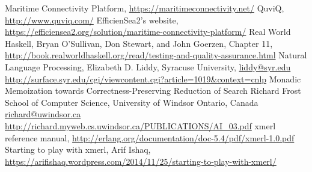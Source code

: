\begin{thebibliography}{9}
		Maritime Connectivity Platform,
		\url{https://maritimeconnectivity.net/}
		QuviQ,
		\url{http://www.quviq.com/}
		EfficienSea2's website,
		\url{https://efficiensea2.org/solution/maritime-connectivity-platform/}
		Real World Haskell,
		Bryan O'Sullivan, Don Stewart, and John Goerzen,
		Chapter 11,
		\url{http://book.realworldhaskell.org/read/testing-and-quality-assurance.html}
		Natural Language Processing,
		Elizabeth D. Liddy,
		Syracuse University,
		\url{liddy@syr.edu}
		\url{http://surface.syr.edu/cgi/viewcontent.cgi?article=1019&context=cnlp}
		Monadic Memoization towards Correctness-Preserving Reduction of Search
		Richard Frost
		School of Computer Science, University of Windsor
		Ontario, Canada
		\url{richard@uwindsor.ca}
		\url{http://richard.myweb.cs.uwindsor.ca/PUBLICATIONS/AI_03.pdf}
		xmerl reference manual,
		\url{http://erlang.org/documentation/doc-5.4/pdf/xmerl-1.0.pdf}
		Starting to play with xmerl,
		Arif Ishaq,
		\url{https://arifishaq.wordpress.com/2014/11/25/starting-to-play-with-xmerl/}
\end{thebibliography}